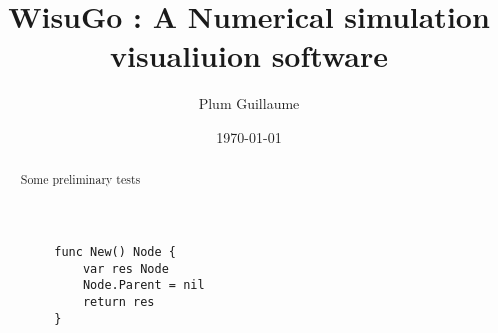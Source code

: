 \documentclass[a4paper,11pt,twoside]{article}%
\title{WisuGo : A Numerical simulation visualiuion software}
\author{Plum Guillaume}
\date{\today}
\renewcommand{\(}{\ensuremath{\left(}}
\renewcommand{\)}{\ensuremath{\right)}}
\begin{document}
	\maketitle

	\begin{abstract}
		Some preliminary tests
	\end{abstract}

	\begin{verbatim}
		func New() Node {
			var res Node
			Node.Parent = nil
			return res
		}
	\end{verbatim}
\end{document}
